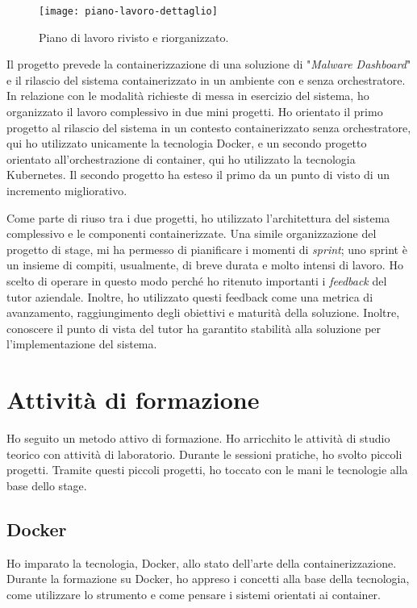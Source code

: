\begin{figure}[htbp]
	\begin{center}
		\texttt{[image: piano-lavoro-dettaglio]}
		\caption{Piano di lavoro rivisto e riorganizzato.}
	\end{center}
\end{figure} 

Il progetto prevede la containerizzazione di una soluzione di
"\textit{Malware Dashboard}" e il rilascio del sistema containerizzato
in un ambiente con e senza orchestratore. In relazione con le modalità 
richieste di messa in esercizio del sistema, ho 
organizzato il lavoro complessivo in due mini progetti.
Ho orientato il primo progetto al rilascio del sistema in un contesto 
containerizzato senza orchestratore, qui ho utilizzato unicamente la 
tecnologia Docker, e un secondo progetto orientato 
all'orchestrazione di container, qui ho utilizzato la tecnologia Kubernetes.
Il secondo progetto ha esteso il primo da un punto di visto 
di un incremento migliorativo.

Come parte di riuso tra i due progetti, ho utilizzato 
l'architettura del sistema complessivo e le componenti 
containerizzate. Una simile organizzazione del progetto 
di stage, mi ha permesso di pianificare i momenti di  
\textit{sprint}; uno sprint è un insieme di compiti, 
usualmente, di breve durata e molto intensi di lavoro. Ho scelto
di operare in questo modo perché ho ritenuto importanti i \textit{feedback} 
del tutor aziendale. Inoltre, ho utilizzato questi feedback come una metrica di 
avanzamento, raggiungimento degli obiettivi e maturità della soluzione. Inoltre, 
conoscere il punto di vista del tutor ha garantito stabilità alla soluzione 
per l'implementazione del sistema. 

\section{Attività di formazione}

Ho seguito un metodo attivo di formazione. Ho arricchito le 
attività di studio teorico con attività di laboratorio. 
Durante le sessioni pratiche, ho svolto piccoli 
progetti. Tramite questi piccoli progetti, ho toccato 
con le mani le tecnologie alla base dello stage. 

\subsection{Docker}

Ho imparato la tecnologia, Docker, allo stato dell'arte della 
containerizzazione. Durante la formazione su Docker, ho 
appreso i concetti alla base della tecnologia, come utilizzare 
lo strumento e come pensare i sistemi orientati ai container.

